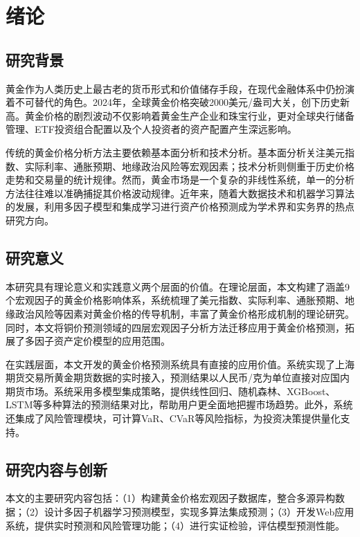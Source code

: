 \documentclass[UTF8,a4paper,12pt]{ctexart}
\begin{document}
\newpage
\setcounter{page}{1}

\section{绪论}

\subsection{研究背景}

黄金作为人类历史上最古老的货币形式和价值储存手段，在现代金融体系中仍扮演着不可替代的角色。2024年，全球黄金价格突破2000美元/盎司大关，创下历史新高。黄金价格的剧烈波动不仅影响着黄金生产企业和珠宝行业，更对全球央行储备管理、ETF投资组合配置以及个人投资者的资产配置产生深远影响。

传统的黄金价格分析方法主要依赖基本面分析和技术分析。基本面分析关注美元指数、实际利率、通胀预期、地缘政治风险等宏观因素；技术分析则侧重于历史价格走势和交易量的统计规律。然而，黄金市场是一个复杂的非线性系统，单一的分析方法往往难以准确捕捉其价格波动规律。近年来，随着大数据技术和机器学习算法的发展，利用多因子模型和集成学习进行资产价格预测成为学术界和实务界的热点研究方向。

\subsection{研究意义}

本研究具有理论意义和实践意义两个层面的价值。在理论层面，本文构建了涵盖9个宏观因子的黄金价格影响体系，系统梳理了美元指数、实际利率、通胀预期、地缘政治风险等因素对黄金价格的传导机制，丰富了黄金价格形成机制的理论研究。同时，本文将铜价预测领域的四层宏观因子分析方法迁移应用于黄金价格预测，拓展了多因子资产定价模型的应用范围。

在实践层面，本文开发的黄金价格预测系统具有直接的应用价值。系统实现了上海期货交易所黄金期货数据的实时接入，预测结果以人民币/克为单位直接对应国内期货市场。系统采用多模型集成策略，提供线性回归、随机森林、XGBoost、LSTM等多种算法的预测结果对比，帮助用户更全面地把握市场趋势。此外，系统还集成了风险管理模块，可计算VaR、CVaR等风险指标，为投资决策提供量化支持。

\subsection{研究内容与创新}

本文的主要研究内容包括：（1）构建黄金价格宏观因子数据库，整合多源异构数据；（2）设计多因子机器学习预测模型，实现多算法集成预测；（3）开发Web应用系统，提供实时预测和风险管理功能；（4）进行实证检验，评估模型预测性能。
\end{document}
